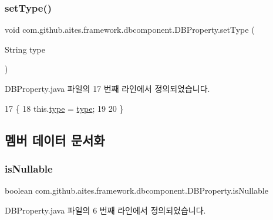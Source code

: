 \subsubsection{\texorpdfstring{set\+Type()}{setType()}}
{\footnotesize\ttfamily void com.\+github.\+aites.\+framework.\+dbcomponent.\+D\+B\+Property.\+set\+Type (\begin{DoxyParamCaption}\item[{String}]{type }\end{DoxyParamCaption})}



D\+B\+Property.\+java 파일의 17 번째 라인에서 정의되었습니다.


\begin{DoxyCode}
17                                         \{
18             this.\mbox{\hyperlink{classcom_1_1github_1_1aites_1_1framework_1_1dbcomponent_1_1_d_b_property_aee1abc4b687abc96bedf9b19d1f52a95}{type}} = \mbox{\hyperlink{classcom_1_1github_1_1aites_1_1framework_1_1dbcomponent_1_1_d_b_property_aee1abc4b687abc96bedf9b19d1f52a95}{type}};
19             
20         \}
\end{DoxyCode}


\subsection{멤버 데이터 문서화}
\mbox{\label{classcom_1_1github_1_1aites_1_1framework_1_1dbcomponent_1_1_d_b_property_a09f366cba7a3b9bc3dfeb0cc2941b964}} 
\subsubsection{\texorpdfstring{is\+Nullable}{isNullable}}
{\footnotesize\ttfamily boolean com.\+github.\+aites.\+framework.\+dbcomponent.\+D\+B\+Property.\+is\+Nullable\hspace{0.3cm}{\ttfamily [private]}}



D\+B\+Property.\+java 파일의 6 번째 라인에서 정의되었습니다.

